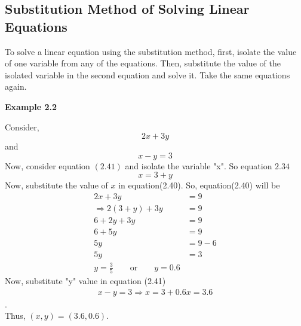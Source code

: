 \documentclass[a4paper, 12pt]{report}
\begin{document}
{         \subsection{Substitution Method of Solving Linear Equations}
         To solve a linear equation using the substitution method, first, isolate the value of one variable from any of the equations. Then, substitute the value of the isolated variable in the second equation and solve it. Take the same equations again.\\
         \begin{center}
         	\textbf{Example 2.2}
         \end{center}
         Consider,
         \begin{equation}
         2x + 3y
         \end{equation}
         and 
         \begin{equation}
         x - y = 3
         \end{equation}
         Now, consider equation $(2.41)$ and isolate the variable "x".
         So equation ${2.34}$
         \begin{equation}
         x = 3 + y
         \end{equation}
         Now, substitute the value of $x$ in equation(2.40). So, equation(2.40) will be
         \begin{align*}
         2x + 3y &= 9\\
         \Rightarrow 2(3 + y) + 3y &= 9\\
         6 + 2y + 3y &= 9\\
         6 + 5y &= 9\\
         5y &= 9 - 6\\
         5y &= 3\\
         y = \frac{3}{5} \qquad \text {or} \qquad y = 0.6
           \end{align*}
          Now, substitute "y" value in equation (2.41)
          \begin{align*}
          x - y = 3
          \Rightarrow x = 3 + 0.6
          x = 3.6
          \end{align*}.\\
          Thus, $(x, y) = (3.6, 0.6)$.\\
          
}
\end{document}
